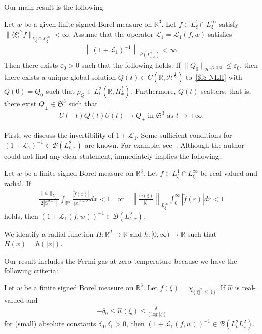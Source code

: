 \documentclass[10pt,a4paper]{amsart}
\providecommand{\No}[1]{\left\| #1 \right\|}
\newcommand{\BR}{\mathbb{R}}
\newcommand{\BS}{\mathbb{S}}
\newcommand{\CB}{\mathcal{B}}
\newcommand{\CH}{\mathcal{H}}
\newcommand{\CL}{\mathcal{L}}
\newcommand{\FS}{\mathfrak{S}}
\newcommand{\de}{\delta}
\newcommand{\ep}{\varepsilon}
\newcommand{\rh}{\rho}
\newcommand{\ch}{\chi}
\newcommand{\wh}{\widehat}
\newcommand{\Br}[1]{\langle #1 \rangle}
\renewcommand{\No}[1]{\left\| #1 \right\|}
\newcommand{\I}{\infty}
\newcommand{\lxr}{\langle \xi \rangle}
\newcommand{\R}{\mathbb{R}}
\newcommand{\tw}{\frac{1}{2}}
\begin{document}
Our main result is the following:


\begin{theo} \label{main}
Let $w$ be a given finite signed Borel measure on $\BR^3$. Let $f \in L^1_\xi \cap L^\I_\xi$ satisfy $\|\lxr^2 f\|_{L^1_\xi \cap L^\I_\xi} < \I$. Assume that the operator $\CL_1 = \CL_1(f,w)$ satisfies
\begin{align}
\left\|(1+\CL_1)^{-1}\right\|_{\CB(L^2_{t,x})} < \I.
\end{align}
Then there exists $\ep_0 > 0$ such that the following holds. If $\| Q_0 \|_{\CH^{1/2,3/2}} \leq \ep_0$, then there exists a unique global solution $Q(t) \in C(\BR, \CH^\tw)$ to~\eqref{$f$-NLH} with $Q(0)=Q_0$ such that $\rh_Q \in L^2_t(\BR, H^\tw_x)$. Furthermore, $Q(t)$ scatters; that is, there exist $Q_{\pm} \in \FS^3$ such that
\begin{align}
U(-t)Q(t)U(t) \to Q_\pm \text{ in } \FS^3 \text{ as } t \to \pm \I.
\end{align}
\end{theo}


First, we discuss the invertibility of $1+\CL_1$. Some sufficient conditions for $(1+\CL_1)^{-1} \in \CB(L^2_{t,x})$ are known. For example, see~\cite[Corollary~1]{2014LS}. Although the author could not find any clear statement, \cite[Proposition~1]{2014LS} immediately implies the following:

\begin{prop}
Let $w$ be a finite signed Borel measure on $\R^3$. Let $f \in L^1_\xi \cap L^\I_\xi$ be real-valued and radial. If
\begin{align}
\frac{\|\widehat{w}\|_{L^\I_\xi}}{2\left|\BS^{d-1}\right|} \int_{\BR^d} \frac{\left|\check{f}(x)\right|}{|x|^{d-2}} dx < 1
\quad \text{or}
\quad \No{\frac{\wh{w}(\xi)}{|\xi|}}_{L^\I_\xi} \int_0^\I \left|\check{f}(r)\right|dr < 1
\end{align}
holds, then $(1+\CL_1(f,w))^{-1} \in \CB(L^2_{t,x})$.
\end{prop}

\begin{rema}
We identify a radial function $H:\BR^d \to \BR$ and $h:[0,\I) \to \BR$ such that $H(x) = h(|x|)$.
\end{rema}

Our result includes the Fermi gas at zero temperature because we have the following criteria:

\begin{prop}[{\cite[Proposition~1.6]{2023H}}] \label{cor}
Let $w$ be a finite signed Borel measure on $\BR^3$. Let $f(\xi) = \ch_{\{|\xi|^2\,\le\,1\}}$. If $\wh{w}$ is real-valued and
\begin{align}\label{potential 3D}
-\de_0 \le \wh{w}(\xi) \le \frac{\de_1}{\Br{\log|\xi|}}
\end{align}
for (small) absolute constants $\de_0, \de_1 > 0$, then $(1+\CL_1(f,w))^{-1} \in \CB(L^2_t L^2_x)$.
\end{prop}
\end{document}
